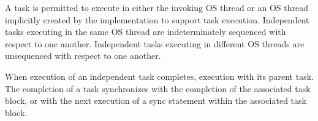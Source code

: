 
\pnum
A task is permitted to execute
in either the invoking OS thread
or an OS thread implicitly created by the implementation
to support task execution.
Independent tasks executing in the same OS thread
are indeterminately sequenced with respect to one another.
Independent tasks executing in different OS threads
are unsequenced with respect to one another.

\pnum
When execution of an independent task completes,
execution
with its parent task.
The completion of a task synchronizes
with the completion of the associated task block,
or with the next execution of a sync statement
within the associated task block.
